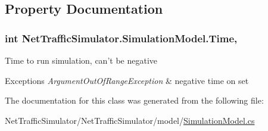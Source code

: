 \subsection{Property Documentation}
\hypertarget{classNetTrafficSimulator_1_1SimulationModel_af6282b8090707c19463e3ca9da347691}{
\subsubsection[{Time}]{\setlength{\rightskip}{0pt plus 5cm}int Net\-Traffic\-Simulator.\-Simulation\-Model.\-Time\hspace{0.3cm}{\ttfamily [get]}, {\ttfamily [set]}}}\label{classNetTrafficSimulator_1_1SimulationModel_af6282b8090707c19463e3ca9da347691}
Time to run simulation, can't be negative 
\begin{DoxyExceptions}{Exceptions}
{\em Argument\-Out\-Of\-Range\-Exception} & negative time on set \\
\hline
\end{DoxyExceptions}


The documentation for this class was generated from the following file\-:\begin{DoxyCompactItemize}
\item 
Net\-Traffic\-Simulator/\-Net\-Traffic\-Simulator/model/\hyperlink{SimulationModel_8cs}{Simulation\-Model.\-cs}\end{DoxyCompactItemize}
